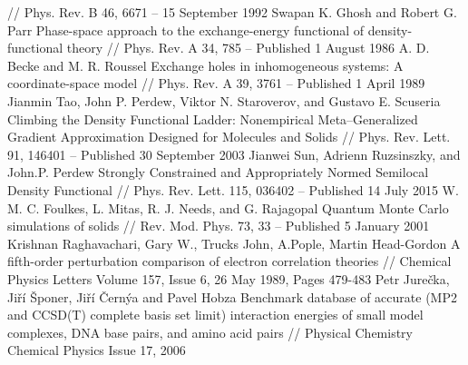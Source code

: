 \begin{thebibliography}{3}
// Phys. Rev. B 46, 6671 – 15 September 1992
Swapan K. Ghosh and Robert G. Parr Phase-space approach to the exchange-energy functional of density-functional theory //
Phys. Rev. A 34, 785 – Published 1 August 1986
A. D. Becke and M. R. Roussel Exchange holes in inhomogeneous systems: A coordinate-space model //
Phys. Rev. A 39, 3761 – Published 1 April 1989
Jianmin Tao, John P. Perdew, Viktor N. Staroverov, and Gustavo E. Scuseria Climbing the Density Functional Ladder: Nonempirical Meta–Generalized Gradient Approximation Designed for Molecules and Solids //
Phys. Rev. Lett. 91, 146401 – Published 30 September 2003
Jianwei Sun, Adrienn Ruzsinszky, and John.P. Perdew Strongly Constrained and Appropriately Normed Semilocal Density Functional //
Phys. Rev. Lett. 115, 036402 – Published 14 July 2015
W. M. C. Foulkes, L. Mitas, R. J. Needs, and G. Rajagopal Quantum Monte Carlo simulations of solids //
Rev. Mod. Phys. 73, 33 – Published 5 January 2001
Krishnan Raghavachari, Gary W., Trucks John, A.Pople, Martin Head-Gordon A fifth-order perturbation comparison of electron correlation theories // Chemical Physics Letters
Volume 157, Issue 6, 26 May 1989, Pages 479-483
Petr Jurečka, Jiří Šponer, Jiří Černýa and Pavel Hobza Benchmark database of accurate (MP2 and CCSD(T) complete basis set limit) interaction energies of small model complexes, DNA base pairs, and amino acid pairs // Physical Chemistry Chemical Physics Issue 17, 2006

\end{thebibliography}
